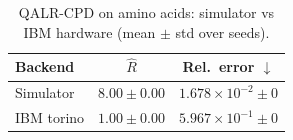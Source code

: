 \begin{table}[t]
\centering
\caption{QALR-CPD on amino acids: simulator vs IBM hardware (mean $\pm$ std over seeds).}
\label{tab:ablation_real_ibm}
\begin{tabular}{@{}lcc@{}}
\toprule
Backend & \(\hat R\) & Rel.\ error \(\downarrow\) \\
\midrule
Simulator & \(8.00 \pm 0.00\) & \(1.678{\times}10^{-2} \pm 0\) \\
IBM torino & \(1.00 \pm 0.00\) & \(5.967{\times}10^{-1} \pm 0\) \\
\bottomrule
\end{tabular}
\end{table}